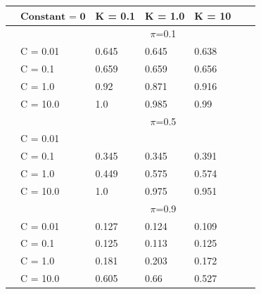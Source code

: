 \documentclass[english]{report}
\begin{document}
\begin{table}[H]
    \centering
    \begin{tabular}{ll|lllll}
        \hline
                                & $\textbf{Constant = 0}$  &         K = 0.1 & K = 1.0 & K = 10 \\ \hline
                                & & \multicolumn{3}{c}{$\pi$=0.1} \\ \hline
                                & C = 0.01   & 0.645 & 0.645 & 0.638    \\
                                & C = 0.1    & 0.659 & 0.659 & 0.656  \\
                                & C = 1.0    & 0.92 & 0.871 & 0.916    \\
                                & C = 10.0   & 1.0 & 0.985 & 0.99  \\ \hline

                                & & \multicolumn{3}{c}{$\pi$=0.5} \\ \hline
                                & C = 0.01   & \color{red}{0.33} & \color{red}{0.344} & \color{red}{0.354}   \\
                                & C = 0.1    & 0.345 & 0.345 & 0.391  \\
                                & C = 1.0    & 0.449 & 0.575 & 0.574    \\
                                & C = 10.0   & 1.0 & 0.975 & 0.951  \\ \hline

                                & & \multicolumn{3}{c}{$\pi$=0.9} \\ \hline
                                & C = 0.01   & 0.127 & 0.124 & 0.109  \\
                                & C = 0.1    & 0.125 & 0.113 & 0.125  \\
                                & C = 1.0    & 0.181 & 0.203 & 0.172    \\
                                & C = 10.0   & 0.605 & 0.66 & 0.527  \\ 
    \hline
    \end{tabular}
    \label{tab:PolySVM_PCA9_c0_valid}
\end{table}
\end{document}
